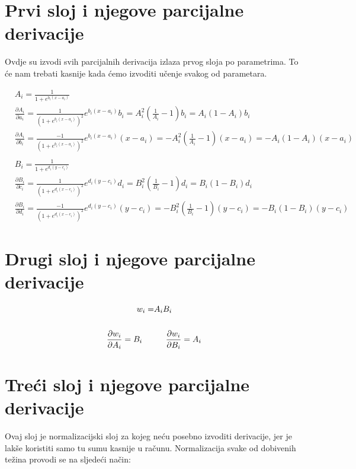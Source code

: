 \documentclass{article}
\begin{document}
\section{Prvi sloj i njegove parcijalne derivacije}

Ovdje su izvodi svih parcijalnih derivacija izlaza prvog sloja po parametrima. To će nam trebati kasnije kada ćemo izvoditi učenje svakog od parametara.

\begin{align*}
  & A_{i} = \frac{1}{1 + e^{b_{i}(x - a_{i})}} \\
  & \frac{\partial A_{i}}{\partial a_{i}} = \frac{1}{(1 + e^{b_{i}(x - a_{i})})^2} e^{b_{i}(x - a_{i})} b_{i} = A_{i}^{2} (\frac{1}{A_{i}} - 1) b_{i} = A_{i} (1 - A_{i}) b_{i} \\
  & \frac{\partial A_{i}}{\partial b_{i}} = \frac{-1}{(1 + e^{b_{i}(x - a_{i})})^2} e^{b_{i}(x - a_{i})} (x - a_{i}) = -A_{i}^{2} (\frac{1}{A_{i}} - 1) (x - a_{i}) = -A_{i}(1 - A_{i})(x - a_{i})
  \\ \\
  & B_{i} = \frac{1}{1 + e^{d_{i}(y - c_{i})}} \\
  & \frac{\partial B_{i}}{\partial c_{i}} = \frac{1}{(1 + e^{d_{i}(x - c_{i})})^2} e^{d_{i}(y - c_{i})} d_{i} = B_{i}^{2} (\frac{1}{B_{i}} - 1) d_{i} = B_{i} (1 - B_{i}) d_{i} \\
  & \frac{\partial B_{i}}{\partial d_{i}} = \frac{-1}{(1 + e^{d_{i}(x - c_{i})})^2} e^{d_{i}(y - c_{i})} (y - c_{i}) = -B_{i}^{2} (\frac{1}{B_{i}} - 1) (y - c_{i}) = -B_{i}(1 - B_{i})(y - c_{i})
\end{align*}

\section{Drugi sloj i njegove parcijalne derivacije}

\begin{align*}
 	w_{i} =& A_{i} B_{i} \\ \\
	\frac{\partial w_{i}}{\partial A_{i}} = B_{i} \hspace{5mm} & \hspace{5mm} \frac{\partial w_{i}}{\partial B_{i}} = A_{i}
\end{align*}

\section{Treći sloj i njegove parcijalne derivacije}
Ovaj sloj je normalizacijski sloj za kojeg neću posebno izvoditi derivacije, jer je lakše koristiti samo tu sumu kasnije u računu. Normalizacija svake od dobivenih težina provodi se na sljedeći način:
\end{document}
